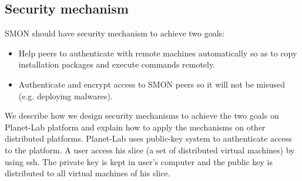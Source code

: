 \subsection{Security mechanism}
\label{subsec:security}

SMON should have security mechanism to achieve two goals:

\begin{itemize}

  \item Help peers to authenticate with remote machines
  automatically so as to copy installation packages and
  execute commands remotely.

  \item Authenticate and encrypt access to SMON peers so it
  will not be misused (e.g. deploying malwares).

\end{itemize}


We describe how we design security mechanisms to achieve the
two goals on Planet-Lab platform and explain how to apply
the mechanisms on other distributed platforms.  Planet-Lab
uses public-key system to authenticate access to the
platform. A user access his slice (a set of distributed
virtual machines) by using ssh. The private key is kept in
user's computer and the public key is distributed to all
virtual machines of his slice.



